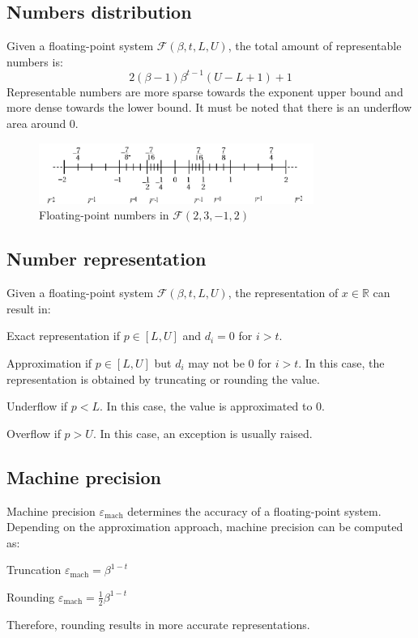 \subsection{Numbers distribution}
Given a floating-point system $\mathcal{F}(\beta, t, L, U)$, the total amount of representable numbers is:
\begin{equation*}
    2(\beta-1) \beta^{t-1} (U-L+1)+1
\end{equation*}
%
Representable numbers are more sparse towards the exponent upper bound and more dense towards the lower bound.
It must be noted that there is an underflow area around 0.
\begin{figure}[h]
    \centering
    \includegraphics[width=0.8\textwidth]{img/floatingpoint_range.png}
    \caption{Floating-point numbers in $\mathcal{F}(2, 3, -1, 2)$}
\end{figure}


\subsection{Number representation}
Given a floating-point system $\mathcal{F}(\beta, t, L, U)$, the representation of $x \in \mathbb{R}$ can result in:
\begin{descriptionlist}
    \item[Exact representation] 
        if $p \in [L, U]$ and $d_i=0$ for $i>t$.

    \item[Approximation] 
        if $p \in [L, U]$ but $d_i$ may not be 0 for $i>t$. 
        In this case, the representation is obtained by truncating or rounding the value.

    \item[Underflow] 
        if $p < L$. In this case, the value is approximated to 0.

    \item[Overflow] 
        if $p > U$. In this case, an exception is usually raised.
\end{descriptionlist}


\subsection{Machine precision}
Machine precision $\varepsilon_{\text{mach}}$ determines the accuracy of a floating-point system. 
Depending on the approximation approach, machine precision can be computed as:
\begin{descriptionlist}
    \item[Truncation] $\varepsilon_{\text{mach}} = \beta^{1-t}$
    \item[Rounding] $\varepsilon_{\text{mach}} = \frac{1}{2}\beta^{1-t}$
\end{descriptionlist}
Therefore, rounding results in more accurate representations.

